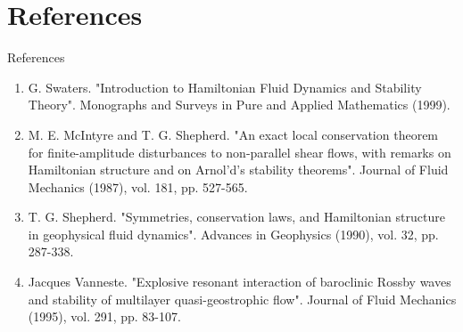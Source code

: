 \documentclass{beamer}
\begin{document}
	\section{References}
		\begin{frame}{References}
			\begin{enumerate}
				\item G. Swaters. "Introduction to Hamiltonian Fluid Dynamics and Stability Theory". Monographs and Surveys in Pure and Applied Mathematics (1999).
				\item  M. E. McIntyre and T. G. Shepherd. "An exact local conservation theorem for finite-amplitude disturbances to non-parallel shear flows, with remarks on Hamiltonian structure and on Arnol’d’s stability theorems". Journal of Fluid Mechanics (1987), vol. 181, pp. 527-565.
				\item T. G. Shepherd. "Symmetries, conservation laws, and Hamiltonian structure in geophysical fluid dynamics". Advances in Geophysics (1990), vol. 32, pp. 287-338.
				\item Jacques Vanneste. "Explosive resonant interaction of baroclinic Rossby waves and stability of multilayer quasi-geostrophic flow". Journal of Fluid Mechanics (1995), vol. 291, pp. 83-107.
			\end{enumerate}
		\end{frame}
\end{document}
